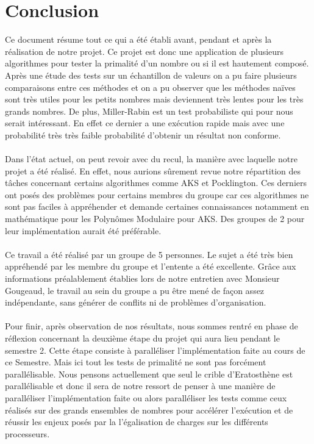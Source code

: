 	\section{Conclusion}
	
	Ce document résume tout ce qui a été établi avant, pendant et après la réalisation de notre projet. Ce projet est donc une application de plusieurs algorithmes pour tester la primalité d'un nombre ou si il est hautement composé. Après une étude des tests sur un échantillon de valeurs on a pu faire plusieurs comparaisons entre ces méthodes et on a pu observer que les méthodes naïves sont très utiles pour les petits nombres mais deviennent très lentes pour les très grands nombres. De plus, Miller-Rabin est un test probabiliste qui pour nous serait intéressant. En effet ce dernier a une exécution rapide mais avec une probabilité très très faible probabilité d'obtenir un résultat non conforme.
		\paragraph{} Dans l'état actuel, on peut revoir avec du recul, la manière avec laquelle notre projet a été réalisé. En effet, nous aurions sûrement revue notre répartition des tâches concernant certains algorithmes comme AKS et Pocklington. Ces derniers ont posés des problèmes pour certains membres du groupe car ces algorithmes ne sont pas faciles à appréhender et demande certaines connaissances notamment en mathématique pour les Polynômes Modulaire pour AKS. Des groupes de 2 pour leur implémentation aurait été préférable.
		\paragraph{} Ce travail a été réalisé par un groupe de 5 personnes. Le sujet a été très bien appréhendé par les membre du groupe et l'entente a été excellente. Grâce aux informations préalablement établies lors de notre entretien avec Monsieur Gougeaud, le travail au sein du groupe a pu être mené de façon assez indépendante, sans générer de conflits ni de problèmes d'organisation.		
		\paragraph{} Pour finir, après observation de nos résultats, nous sommes rentré en phase de réflexion concernant la deuxième étape du projet qui aura lieu pendant le semestre 2. Cette étape consiste à paralléliser l'implémentation faite au cours de ce Semestre. Mais ici tout les tests de primalité ne sont pas forcément parallélisable. Nous pensons actuellement que seul le crible d'Eratosthène est parallélisable et donc il sera de notre ressort de penser à une manière de paralléliser l'implémentation faite ou alors paralléliser les tests comme ceux réalisés sur des grands ensembles de nombres pour accélérer l'exécution et de réussir les enjeux posés par la l'égalisation de charges sur les différents processeurs.

